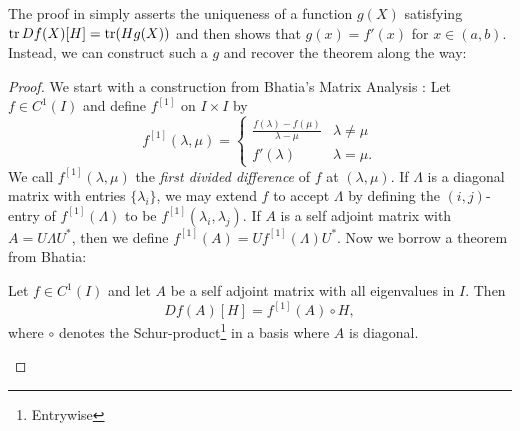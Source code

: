 The proof in \cite{pascoeTrace2020} simply asserts the uniqueness of a function
\(g(X)\) satisfying \(\operatorname{tr} Df(X)[H] = \operatorname{tr}(Hg(X))\) and then shows that
\(g(x)=f'(x)\) for \(x \in (a,b)\). Instead, we can construct such a \(g\) and
recover the theorem along the way:
\begin{proof}

We start with a construction from Bhatia's Matrix Analysis \cite{bhatiaMatrixAnalysis1997}: Let
$f \in C ^{1} (I)$ and define $f ^{[1]} $ on $I \times I$ by
\[
  f^{[1]} (\lambda,\mu) =
  \begin{cases}
    \frac{f(\lambda) - f(\mu)}{\lambda-\mu} & \lambda \neq \mu \\
    f'(\lambda) & \lambda = \mu.
  \end{cases}
\]
We call $f ^{[1]} (\lambda,\mu)$ the \emph{first divided difference} of $f$ at
$(\lambda,\mu)$. If $\Lambda$ is a diagonal matrix with entries
$\{ \lambda_{i}\} $, we may extend $f$ to accept $\Lambda$ by
defining the $(i,j)$-entry of $f ^{[1]} (\Lambda)$ to be
$f ^{[1]} (\lambda_i,\lambda_j)$. If $A$ is a self adjoint matrix with
$A = U \Lambda U ^{*} $, then we define
$f ^{[1]} (A) = U f ^{[1]} (\Lambda) U ^{*} $. Now we borrow a theorem from
Bhatia:
\begin{theorem}[Bhatia V.3.3]
  Let $f \in C ^{1} (I)$ and let $A$ be a self adjoint matrix with all
  eigenvalues in $I$. Then \[
    Df(A)[H] = f ^{[1]} (A) \circ H,
  \]
  where $\circ$ denotes the Schur-product\footnote{Entrywise} in a basis where $A$ is diagonal.
\end{theorem}


\end{proof}
